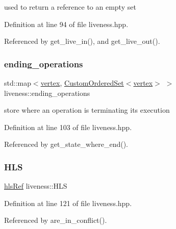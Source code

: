used to return a reference to an empty set 



Definition at line 94 of file liveness.\+hpp.



Referenced by get\+\_\+live\+\_\+in(), and get\+\_\+live\+\_\+out().

\mbox{\label{classliveness_ac3be9cc9f8b3cbe5add476031ee9edb7}} 
\subsubsection{\texorpdfstring{ending\+\_\+operations}{ending\_operations}}
{\footnotesize\ttfamily std\+::map$<$\hyperlink{graph_8hpp_abefdcf0544e601805af44eca032cca14}{vertex}, \hyperlink{classCustomOrderedSet}{Custom\+Ordered\+Set}$<$\hyperlink{graph_8hpp_abefdcf0544e601805af44eca032cca14}{vertex}$>$ $>$ liveness\+::ending\+\_\+operations\hspace{0.3cm}{\ttfamily [private]}}



store where an operation is terminating its execution 



Definition at line 103 of file liveness.\+hpp.



Referenced by get\+\_\+state\+\_\+where\+\_\+end().

\mbox{\label{classliveness_af5e5e69f36b104fc3f335881cdc0ac77}} 
\subsubsection{\texorpdfstring{H\+LS}{HLS}}
{\footnotesize\ttfamily \hyperlink{hls_8hpp_a75d0c73923d0ddfa28c4843a802c73a7}{hls\+Ref} liveness\+::\+H\+LS\hspace{0.3cm}{\ttfamily [private]}}



Definition at line 121 of file liveness.\+hpp.



Referenced by are\+\_\+in\+\_\+conflict().

\mbox{\label{classliveness_a95836be57bfe30a8957942c76dd489a9}} 
